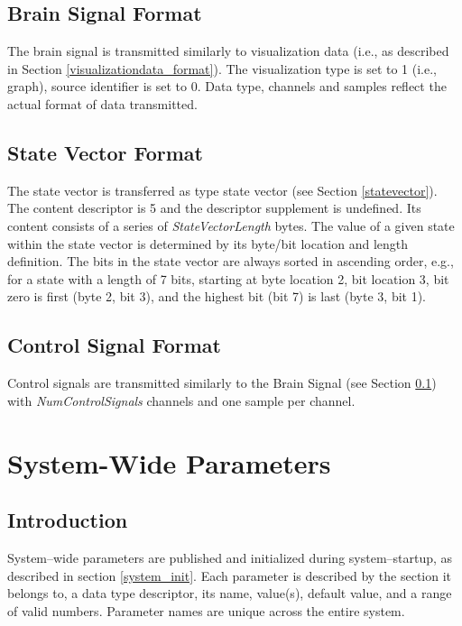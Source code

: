 \documentclass[letterpaper,oneside,12pt]{book}
\begin{document}
\subsection{Brain Signal Format}
\label{sec:eegsigformat}

The brain signal is transmitted similarly to visualization data (i.e., as 
described in Section \ref{visualizationdata_format}). The visualization type is 
set to 1 (i.e., graph), source identifier is set to 0. Data type, channels and samples reflect the actual format of data transmitted.


\subsection{State Vector Format}
\label{statevector_format}

The state vector is transferred as type state vector (see Section 
\ref{statevector}). The content descriptor is 5 and the descriptor supplement is 
undefined. Its content consists of a series of \textit{StateVectorLength} bytes. 
The value of a given state within the state vector is determined by its byte/bit 
location and length definition. The bits in the state vector are always sorted 
in ascending order, e.g., for a state with a length of 7 bits, starting at byte 
location 2, bit location 3, bit zero is first (byte 2, bit 3), and the highest 
bit (bit 7) is last (byte 3, bit 1).

\subsection{Control Signal Format}

Control signals are transmitted similarly to the Brain Signal (see Section 
\ref{sec:eegsigformat}) with \textit{NumControlSignals} channels and one sample 
per channel.


\section{System-Wide Parameters}
\label{system_params}

\subsection{Introduction}

System--wide parameters are published and initialized during system--startup, as 
described in section \ref{system_init}. Each parameter is described by the 
section it belongs to, a data type descriptor, its name, value(s), default 
value, and a range of valid numbers. Parameter names are unique across the 
entire system.
\end{document}

